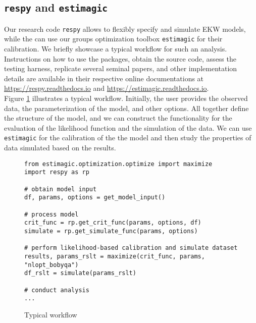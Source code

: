\subsection{\texttt{respy} and \texttt{estimagic}}
Our research code \verb+respy+ allows to flexibly specify and simulate EKW models, while the can use our groups optimization toolbox  \verb+estimagic+ for their calibration. We briefly showcase a typical workflow for such an analysis. Instructions on how to use the packages, obtain the source code, assess the testing harness, replicate several seminal papers, and other implementation details are available in their respective online documentations at \url{https://respy.readthedocs.io} and \url{https://estimagic.readthedocs.io}.\\

\noindent Figure \ref{Typical workflow} illustrates a typical workflow. Initially, the user provides the observed data, the parameterization of the model, and other options. All together define the structure of the model, and we can construct the functionality for the evaluation of the likelihood function and the simulation of the data. We can use \verb+estimagic+ for the calibration of the the model and then study the properties of data simulated based on the results.

\begin{figure}[ht!]\centering
\caption{Typical workflow}\label{Typical workflow}
\begin{lstlisting}
from estimagic.optimization.optimize import maximize
import respy as rp

# obtain model input
df, params, options = get_model_input()

# process model
crit_func = rp.get_crit_func(params, options, df)
simulate = rp.get_simulate_func(params, options)

# perform likelihood-based calibration and simulate dataset
results, params_rslt = maximize(crit_func, params, "nlopt_bobyqa")
df_rslt = simulate(params_rslt)

# conduct analysis
...

\end{lstlisting}
\end{figure}\FloatBarrier


